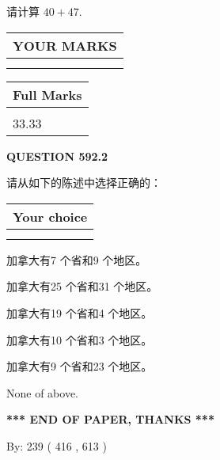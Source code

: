 \documentclass{ctexart}
\begin{document}
  
 
请计算 $ %
40 +  %
47 $.
 

 

 
  
\vspace{0.2in}
  
\noindent\begin{tabular}{|l|}
\hline
 YOUR MARKS  \\
\hline
 \\ 
 \\ 
\hline
\end{tabular}
\hspace{0.05in} \begin{tabular}{|l|}
\hline
 Full Marks  \\
\hline
 \\ 
33.33 \\
\hline
\end{tabular}
{\textbf{\Large{QUESTION
592.2 
}}}
  
  
请从如下的陈述中选择正确的：
  
  
\noindent\hspace{3.0in} \begin{tabular}{|l|}
\hline
Your choice \\
\hline
 \\ 
 \\ 
\hline
\end{tabular}
  
  
 
 
加拿大有7 个省和9 个地区。
 
 
加拿大有25 个省和31 个地区。
 
 
加拿大有19 个省和4 个地区。
 
 
加拿大有10 个省和3 个地区。
 
 
加拿大有9 个省和23 个地区。
 
 
 None of above.
 
 
   
   
 \vspace{0.2in}
 
   
   
   
   
\vspace{1.0in} 
{\textbf{\large{ *** END OF PAPER, THANKS *** }}} 
   
   
\hspace{1.0in} By: 
 239 ( 416 ,  613 )
   
\end{document}
